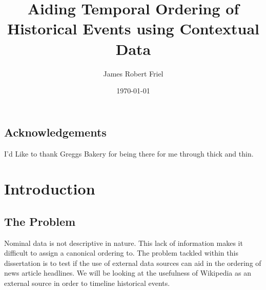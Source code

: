 \documentclass[bsc,frontabs,twoside,singlespacing,parskip,deptreport]{infthesis}     %
\begin{document}
\title{Aiding Temporal Ordering of Historical Events using Contextual Data}

\author{James Robert Friel}
 

\date{\today}

\abstract{}


\maketitle

\section*{Acknowledgements}
I'd Like to thank Greggs Bakery for being there for me through thick and thin.

\tableofcontents



\chapter{Introduction}
\section{The Problem}
Nominal data is not descriptive in nature. This lack of information makes it difficult to assign
a canonical ordering to.
The problem tackled within this dissertation is to test if the use of external data sources can
aid in the ordering of news article headlines.
We will be looking at the usefulness of Wikipedia as an external source in order to timeline
historical events.
\end{document}
